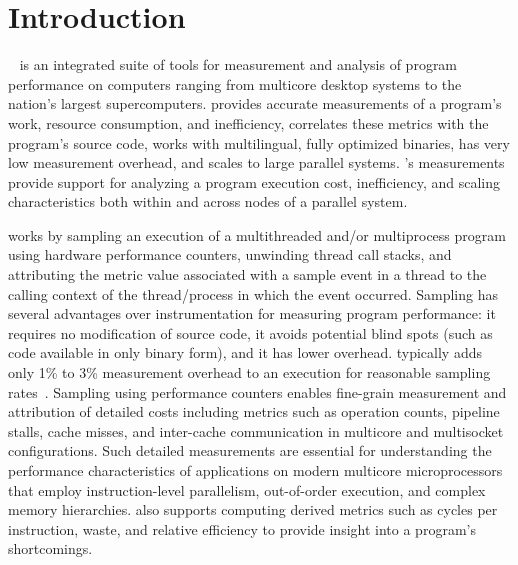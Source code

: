 \documentclass[11pt,letterpaper]{report}
\begin{document}

\newpage
\pagestyle{plain}
\setcounter{page}{1}

\chapter{Introduction}

\HPCToolkit{}~\cite{Adhianto-etal:2010:CPE-hpctoolkit,hpctoolkit-www} is an integrated suite of tools for measurement and analysis of program performance on computers ranging from multicore desktop systems to the nation's largest supercomputers.
\HPCToolkit{} provides accurate measurements of a program's work, resource consumption, and inefficiency, correlates these metrics with the program's source code, works with multilingual, fully optimized binaries, has very low measurement overhead, and scales to large parallel systems.
\HPCToolkit{}'s measurements provide support for analyzing a program execution cost, inefficiency, and scaling characteristics both within and across nodes of a parallel system.

\HPCToolkit{} works by sampling an execution of a multithreaded and/or multiprocess program using hardware performance counters, unwinding thread call stacks, and attributing the metric value associated with a sample event in a thread to the calling context of the thread/process in which the event occurred.
Sampling has several advantages over instrumentation for measuring program performance: it requires no modification of source code, it avoids potential blind spots (such as code available in only binary form), and it has lower overhead.
\HPCToolkit{} typically adds only 1\% to 3\% measurement overhead to an execution for reasonable sampling rates~\cite{Tallent-MC-Fagan:2009:PLDI-hpctoolkit-binary-analysis}.
Sampling using performance counters enables fine-grain measurement and attribution of detailed costs including metrics such as operation counts, pipeline stalls, cache misses, and inter-cache communication in multicore and multisocket configurations.
Such detailed measurements are essential for understanding the performance characteristics of applications on modern multicore microprocessors that employ instruction-level parallelism, out-of-order execution, and complex memory hierarchies.
\HPCToolkit{} also supports computing derived metrics such as cycles per instruction, waste, and relative efficiency to provide insight into a program's shortcomings.
\end{document}
